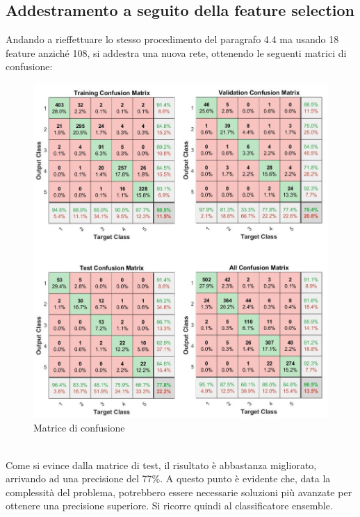 \documentclass[a4paper,11pt]{article}
\begin{document}
    \subsection{Addestramento a seguito della feature selection}
    Andando a rieffettuare lo stesso procedimento del paragrafo 4.4 ma usando 18 feature anziché 108, si addestra una nuova rete, ottenendo le seguenti matrici di confusione:
    \begin{figure}[h]
        \centering
        \includegraphics[scale=0.5]{confusion2}
        \caption{Matrice di confusione}
    \end{figure}
    \\Come si evince dalla matrice di test, il risultato è abbastanza migliorato, arrivando ad una precisione del 77\%.
    A questo punto è evidente che, data la complessità del problema, potrebbero essere necessarie soluzioni più avanzate per ottenere una precisione superiore. 
    Si ricorre quindi al classificatore ensemble.
\end{document}

